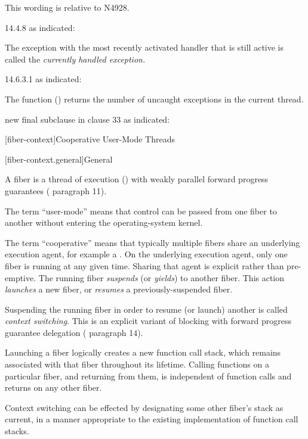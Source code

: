 \newpage
{}\label{api}

This wording is relative to N4928.\cite{Standard}

 14.4.8  as indicated:

The exception with the most recently activated handler that is still active is called the \emph{currently handled exception.}

 14.6.3.1  as indicated:

The function 
() returns the number of uncaught exceptions
in the current thread.

 new final subclause in clause 33  as indicated:

\setcounter{section}{33}
\setcounter{subsection}{10}

[fiber-context]{Cooperative User-Mode Threads}

[fiber-context.general]{General}

A fiber is a thread of execution () with
weakly parallel forward progress guarantees ( paragraph 11).

The term ``user-mode'' means that control can be passed from one fiber to
another without entering the operating-system kernel.

The term ``cooperative'' means that typically multiple fibers share an
underlying execution agent, for example a . On the
underlying execution agent, only one fiber is running at any given time. Sharing
that agent is explicit rather than pre-emptive. The running
fiber \emph{suspends} (or \emph{yields}) to another fiber. This
action \emph{launches} a new fiber, or \emph{resumes} a previously-suspended
fiber.

Suspending the running fiber in order to resume (or launch) another is
called \emph{context switching}. This is an explicit variant of blocking with
forward progress guarantee delegation ( paragraph 14).

Launching a fiber logically creates a new function call stack, which remains
associated with that fiber throughout its lifetime. Calling functions on a
particular fiber, and returning from them, is independent of function calls
and returns on any other fiber.

Context switching can be effected by designating some other fiber's stack as
current, in a manner appropriate to the existing implementation of function call stacks.

